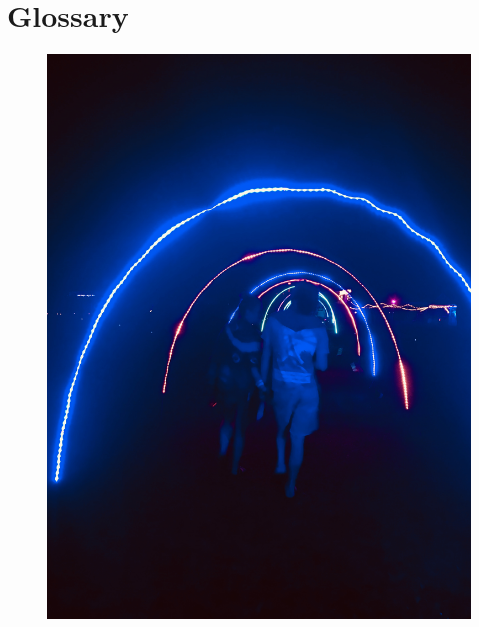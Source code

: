\appendix
\addappheadtotoc
\chapter[Glossary]{Glossary}
\ifisflight
\fi

\printglossaries


\ifisflight
\vspace*{\fill}
\begin{figure}[!h]
\centering
\includegraphics[width=.8\textwidth]{images/filler-images/TTM2017tunnel.jpeg}
\end{figure}
\vspace*{\fill}



\fi



